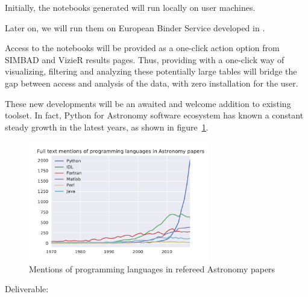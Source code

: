\begin{task}[
  title=Astronomy application,
  id=astro,
  lead=CDS,
  PM=18,
  wphases={0-48},
  partners={CDS}
]
  Initially, the notebooks generated will run locally on user
  machines.

  Later on, we will run them on European Binder Service developed in .

  Access to the notebooks will be provided as a one-click action option from
  SIMBAD and VizieR results pages.
  Thus, providing with a one-click way of visualizing, filtering and analyzing
these potentially large tables will bridge the gap between access and analysis
of the data, with zero installation for the user.

  These new developments will be an awaited and welcome addition to existing
  toolset. In fact, Python for Astronomy software ecosystem has known a constant
    steady growth in the latest years, as shown in figure~\ref{fig:python-astro-citations}.

  \begin{figure}[ht]\centering
  \includegraphics[width=0.7\textwidth]{python-astro-citations}
  \caption{Mentions of programming languages in refereed Astronomy papers}\label{fig:python-astro-citations}
\end{figure}

Deliverable: 




\end{task}
